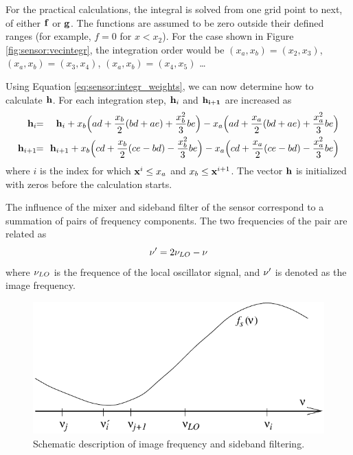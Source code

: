  For the practical calculations, the integral is solved from one grid
 point to next, of either $\mathbf{f}$ or $\mathbf{g}$. The functions are 
 assumed to be zero outside their defined ranges (for example, $f=0$ 
 for $x<x_2$).
 For the case
 shown in Figure \ref{fig:sensor:vecintegr}, the integration order would be
 $(x_a,x_b)=(x_2,x_3)$, $(x_a,x_b)=(x_3,x_4)$, $(x_a,x_b)=(x_4,x_5)$
 \ldots\
  
 Using Equation \ref{eq:sensor:integr_weights}, we can now determine how to
 calculate $\mathbf{h}$. For each integration step, $\mathbf{h}_i$ and
 $\mathbf{h_{i+1}}$ are increased as
 \begin{eqnarray}
    \mat{h}_i \!\! &=& \!\! \mat{h}_i +    
              x_b\Big(ad+\frac{x_b}{2}(bd+ae)+\frac{x_b^2}{3}be\Big) - 
              x_a\Big(ad+\frac{x_a}{2}(bd+ae)+\frac{x_a^2}{3}be\Big) 
    \nonumber \\
    \mat{h}_{i+1} \!\! &=& \!\! \mat{h}_{i+1} +
              x_b\Big(cd+\frac{x_b}{2}(ce-bd)-\frac{x_b^2}{3}be\Big) - 
              x_a\Big(cd+\frac{x_a}{2}(ce-bd)-\frac{x_a^2}{3}be\Big) 
    \nonumber
 \end{eqnarray}
 where $i$ is the index for which $\mathbf{x}^i \leq x_a$ and $x_b \leq
 \mathbf{x}^{i+1}$. The vector $\mathbf{h}$ is initialized with
 zeros before the calculation starts.



  
 The influence of the mixer and sideband filter of the sensor
 correspond to a summation of pairs of frequency components. The two
 frequencies of the pair are related as
 \begin{equation}
    \nu' = 2\nu_{LO}-\nu
 \end{equation}
 where $\nu_{LO}$ is the frequence of the local oscillator signal, and
 $\nu'$ is denoted as the image frequency.

 \begin{figure}[tb]
  \begin{center}
    \includegraphics*[width=0.8\hsize]{Figs/sideband}
    \caption{Schematic description of image frequency and sideband filtering.}
   \label{fig:sensor:sideband} 
  \end{center} 
 \end{figure}
 
